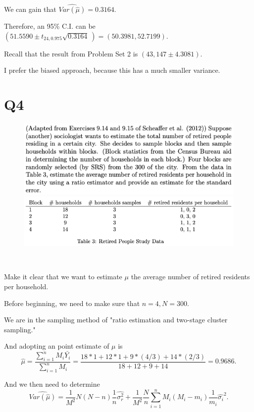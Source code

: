 \documentclass[12pt]{article}%
\begin{document}
We can gain that $\widehat{Var(\hat{\mu})}=0.3164.$

Therefore, an 95\% C.I. can be $(51.5590 \pm t_{24,0.975}\sqrt{0.3164}~)=(50.3981,52.7199).$

Recall that the result from Problem Set 2 is $(43,147 \pm 4.3081).$

I prefer the biased approach, because this has a much smaller variance.

\newpage
\section{Q4}
\begin{figure}[htp]
    \includegraphics[width = 14cm]{img/Q4.png}
    \includegraphics[width = 14cm]{img/Q3(2).png}
\end{figure}


~\ 

Make it clear that we want to estimate $\mu$ the average number of retired residents per household.

Before beginning, we need to make sure that $n=4, N=300.$

We are in the sampling method of "ratio estimation and two-stage cluster sampling."

And adopting an point estimate of $\mu$ is 
$$\hat{\mu}=\frac{\sum_{i=1}^n M_i\bar{Y_i}}{\sum_{i=1}^{n}M_i}=\frac{ 18*1+12*1+9*(4/3)+14*(2/3)  }{ 18+12+9+14 }=0.9686.$$

And we then need to determine 
$$\widehat{Var(\hat{\mu})}=\frac{1}{M^2}N(N-n)\frac{1}{n}\hat{\sigma_r^2}+\frac{1}{M^2}\frac{N}{n}\sum_{i=1}^n M_i(M_i-m_i)\frac{1}{m_i}\hat{\sigma_i}^2.$$
\end{document}

